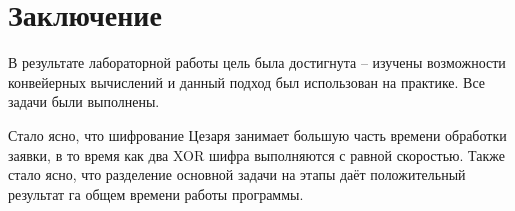\chapter*{Заключение}
\label{cha:conclusion}
В результате лабораторной работы цель была достигнута -- изучены возможности конвейерных вычислений и данный подход был использован на практике. Все задачи были выполнены.
\par Стало ясно, что шифрование Цезаря занимает большую часть времени обработки заявки, в то время как два XOR шифра выполняются с равной скоростью. Также стало ясно, что разделение основной задачи на этапы даёт положительный результат га общем времени работы программы.